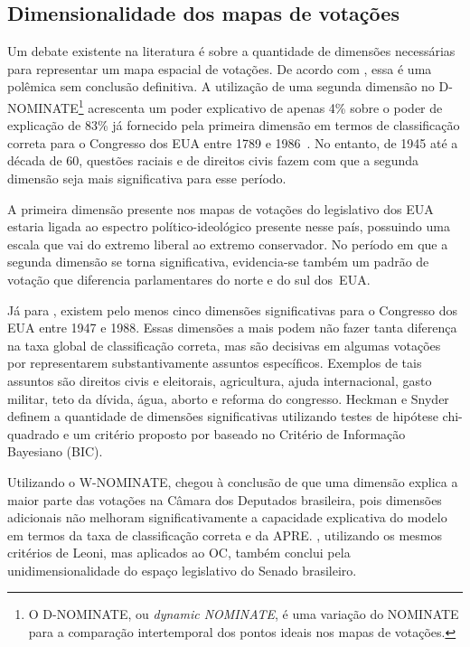 \documentclass[
	article,			%
	12pt,				%
    twoside,			%
	a4paper,			%
	english,			%
	french,				%
	spanish,			%
	brazil,				%
	]{abntex2}
\newcommand\nominate{NOMINATE\xspace}
\begin{document}
\subsection{Dimensionalidade dos mapas de votações}

Um debate existente na literatura é sobre a quantidade de dimensões necessárias para representar um mapa espacial de votações. De acordo com , essa é uma polêmica sem conclusão definitiva.
A utilização de uma segunda dimensão no D-NOMINATE\footnote{O D-NOMINATE, ou \emph{dynamic \nominate}, é uma variação do \nominate para a comparação intertemporal dos pontos ideais nos mapas de votações.} acrescenta um poder explicativo de apenas 4\% sobre o poder de explicação de 83\% já fornecido pela primeira dimensão em termos de classificação correta para o Congresso dos EUA entre 1789 e 1986~\cite{mccarty2011measuring}. No entanto, de 1945 até a década de 60, questões raciais e de direitos civis fazem com que a segunda dimensão seja mais significativa para esse período. 

A primeira dimensão presente nos mapas de votações do legislativo dos EUA estaria ligada ao espectro político-ideológico presente nesse país, possuindo uma escala que vai do extremo liberal ao extremo conservador. No período em que a segunda dimensão se torna significativa, evidencia-se também um padrão de votação que diferencia parlamentares do norte e do sul dos~EUA.  

Já para , existem pelo menos cinco dimensões significativas para o Congresso dos EUA entre 1947 e 1988. Essas dimensões a mais podem não fazer tanta diferença na taxa global de classificação correta, mas são decisivas em algumas votações por representarem substantivamente assuntos específicos. Exemplos de tais assuntos são direitos civis e eleitorais, agricultura, ajuda internacional, gasto militar, teto da dívida, água, aborto e reforma do congresso. Heckman e Snyder definem a quantidade de dimensões significativas utilizando testes de hipótese chi-quadrado e um critério proposto por  baseado no Critério de Informação Bayesiano (BIC). 

Utilizando o W-NOMINATE,  chegou à conclusão de que uma dimensão explica a maior parte das votações na Câmara dos Deputados brasileira, pois dimensões adicionais não melhoram significativamente a capacidade explicativa do modelo em termos da taxa de classificação correta e da APRE. , utilizando os mesmos critérios de Leoni, mas aplicados ao OC, também conclui pela unidimensionalidade do espaço legislativo do Senado brasileiro.
\end{document}
